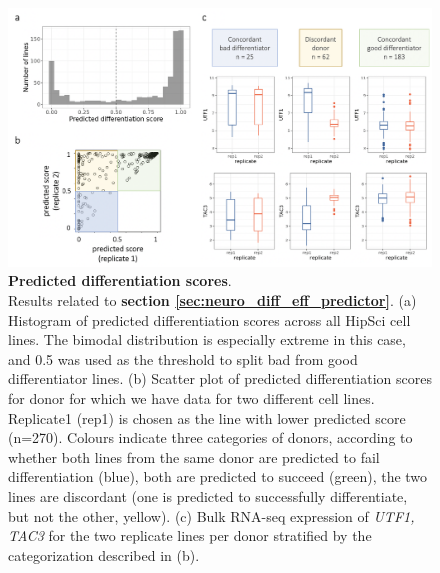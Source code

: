 \begin{figure}[h]
    \centering
    \includegraphics[width=15cm]{Appendix2/Fig/suppl_donor_effects.png}
    \caption[Predicted differentiation scores]{\textbf{Predicted differentiation scores}.\\
    Results related to \textbf{section \ref{sec:neuro_diff_eff_predictor}}.
    (a) Histogram of predicted differentiation scores across all HipSci cell lines. 
    The bimodal distribution is especially extreme in this case, and 0.5 was used as the threshold to split bad from good differentiator lines. 
    (b) Scatter plot of predicted differentiation scores for donor for which we have data for two different cell lines. Replicate1 (rep1) is chosen as the line with lower predicted score (n=270). 
    Colours indicate three categories of donors, according to whether both lines from the same donor are predicted to fail differentiation (blue), both are predicted to succeed (green), the two lines are discordant (one is predicted to successfully differentiate, but not the other, yellow). (c) Bulk RNA-seq expression of \textit{UTF1, TAC3} for the two replicate lines per donor stratified by the categorization described in (b).}
    \label{suppl_fig:predicted_scores_donors}
\end{figure}

